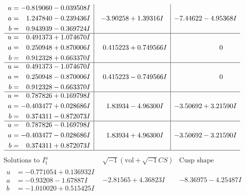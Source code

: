 \documentclass[1p]{elsarticle_modified}
\theoremstyle{definition}
\newcommand{\I}{\sqrt{-1}}
\begin{document}
$$\begin{array}{c|c|c}
\begin{aligned}
u &= -0.819060 - 0.039508 I \\
a &= \phantom{-}1.247840 - 0.239436 I \\
b &= \phantom{-}0.943939 - 0.369724 I\end{aligned}
 & -3.90258 + 1.39316 I & -7.44622 - 4.95368 I \\ \hline\begin{aligned}
u &= \phantom{-}0.491373 + 1.074670 I \\
a &= \phantom{-}0.250948 + 0.870006 I \\
b &= \phantom{-}0.912328 + 0.663370 I\end{aligned}
 & \phantom{-}0.415223 + 0.749566 I & \phantom{-0.000000 } 0 \\ \hline\begin{aligned}
u &= \phantom{-}0.491373 - 1.074670 I \\
a &= \phantom{-}0.250948 - 0.870006 I \\
b &= \phantom{-}0.912328 - 0.663370 I\end{aligned}
 & \phantom{-}0.415223 - 0.749566 I & \phantom{-0.000000 } 0 \\ \hline\begin{aligned}
u &= \phantom{-}0.787826 + 0.169798 I \\
a &= -0.403477 + 0.028686 I \\
b &= \phantom{-}0.374311 - 0.872073 I\end{aligned}
 & \phantom{-}1.83934 - 4.96300 I & -3.50692 + 3.21590 I \\ \hline\begin{aligned}
u &= \phantom{-}0.787826 - 0.169798 I \\
a &= -0.403477 - 0.028686 I \\
b &= \phantom{-}0.374311 + 0.872073 I\end{aligned}
 & \phantom{-}1.83934 + 4.96300 I & -3.50692 - 3.21590 I\\
 \hline 
 \end{array}$$\newpage$$\begin{array}{c|c|c}  
\text{Solutions to }I^u_{1}& \I (\text{vol} + \sqrt{-1}CS) & \text{Cusp shape}\\
 \hline 
\begin{aligned}
u &= -0.771054 + 0.136932 I \\
a &= -0.93208 - 1.67887 I \\
b &= -1.010020 + 0.515425 I\end{aligned}
 & -2.81565 + 4.36823 I & -8.36975 - 4.25487 I \\ \hline\begin{aligned}

\end{aligned}
\end{array}$$
\end{document}
